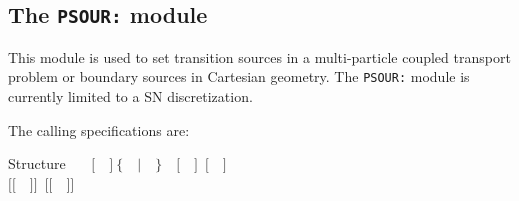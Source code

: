 \subsection{The {\tt PSOUR:} module}\label{sect:PSOURData}

This module is used to set transition sources in a multi-particle coupled transport problem or boundary sources in Cartesian geometry. The {\tt PSOUR:} module
is currently limited to a SN discretization.

\vskip 0.08cm

The calling specifications are:

\begin{DataStructure}{Structure }
~\moc{:=}~~$[$~~$]~\{$~~$|$~~$\}$~~$[$~~$]$~$[$~~$]$ \\
\hspace*{0.5cm}  $[[$~~$]]$~$[[$~~$]]$ \moc{::}~ \\
\end{DataStructure}

